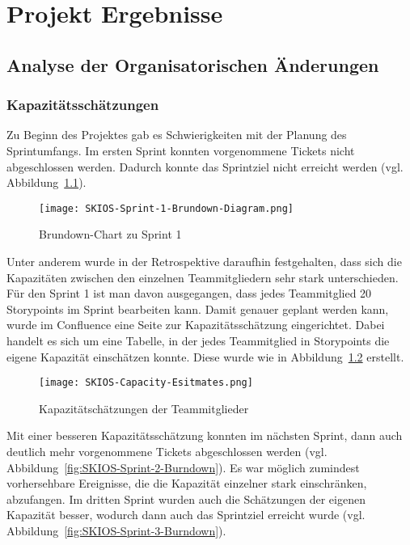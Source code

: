 
\chapter{Projekt Ergebnisse}

\section{Analyse der Organisatorischen Änderungen}

\subsection{Kapazitätsschätzungen}

Zu Beginn des Projektes gab es Schwierigkeiten mit der Planung des Sprintumfangs.
Im ersten Sprint konnten vorgenommene Tickets nicht abgeschlossen werden. 
Dadurch konnte das Sprintziel nicht erreicht werden (vgl. Abbildung~\ref{fig:SKIOS-Sprint-1-Brundown}).

\begin{figure}[h]
    \texttt{[image: SKIOS-Sprint-1-Brundown-Diagram.png]}
    \caption{Brundown-Chart zu Sprint 1}
    \label{fig:SKIOS-Sprint-1-Brundown}
\end{figure}

Unter anderem wurde in der Retrospektive daraufhin festgehalten, 
dass sich die Kapazitäten zwischen den einzelnen Teammitgliedern sehr stark unterschieden.
Für den Sprint 1 ist man davon ausgegangen, dass jedes Teammitglied 20 Storypoints im Sprint bearbeiten kann.
Damit genauer geplant werden kann, wurde im Confluence eine Seite zur Kapazitätsschätzung eingerichtet.
Dabei handelt es sich um eine Tabelle, in der jedes Teammitglied in Storypoints die eigene Kapazität einschätzen konnte.
Diese wurde wie in Abbildung~\ref{fig:Capacitytable} erstellt. 

\begin{figure}[h]
    \texttt{[image: SKIOS-Capacity-Esitmates.png]}
    \caption{Kapazitätschätzungen der Teammitglieder}
    \label{fig:Capacitytable}
\end{figure}

Mit einer besseren Kapazitätsschätzung konnten im nächsten Sprint, dann auch deutlich mehr vorgenommene Tickets abgeschlossen werden (vgl. Abbildung~\ref{fig:SKIOS-Sprint-2-Burndown}).
Es war möglich zumindest vorhersehbare Ereignisse, die die Kapazität einzelner stark einschränken, abzufangen.
Im dritten Sprint wurden auch die Schätzungen der eigenen Kapazität besser, wodurch dann auch das Sprintziel erreicht wurde (vgl. Abbildung~\ref{fig:SKIOS-Sprint-3-Burndown}).

